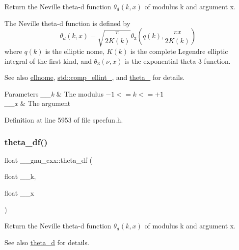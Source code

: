 Return the Neville theta-\/d function $ \theta_d(k,x) $ of modulus {\ttfamily k} and argument {\ttfamily x}.

The Neville theta-\/d function is defined by \[ \theta_d(k,x) = \sqrt{\frac{\pi}{2K(k)}} \theta_3\left(q(k),\frac{\pi x}{2K(k)}\right) \] where $ q(k) $ is the elliptic nome, $ K(k) $ is the complete Legendre elliptic integral of the first kind, and $ \theta_3(\nu,x) $ is the exponential theta-\/3 function. \begin{DoxySeeAlso}{See also}
\hyperlink{group__mathsf__gnu_ga7bfb34f8b5c0ed7c72040f9cb7034bba}{ellnome}, \hyperlink{group__mathsf__std_gad559217fb01e7a8b7a6e23eeedda64be}{std\+::comp\+\_\+ellint\+\_}, and \hyperlink{group__mathsf__gnu_ga146c3b8e86991e164d4bf143cda5f0fc}{theta\+\_} for details.
\end{DoxySeeAlso}

\begin{DoxyParams}{Parameters}
{\em \+\_\+\+\_\+k} & The modulus $ -1 <= k <= +1 $ \\
\hline
{\em \+\_\+\+\_\+x} & The argument \\
\hline
\end{DoxyParams}


Definition at line 5953 of file specfun.\+h.

\mbox{\label{group__mathsf__gnu_gad2dc6fcaf54d25cbfaad082623941118}} 
\subsubsection{\texorpdfstring{theta\+\_\+df()}{theta\_df()}}
{\footnotesize\ttfamily float \+\_\+\+\_\+gnu\+\_\+cxx\+::theta\+\_\+df (\begin{DoxyParamCaption}\item[{float}]{\+\_\+\+\_\+k,  }\item[{float}]{\+\_\+\+\_\+x }\end{DoxyParamCaption})\hspace{0.3cm}{\ttfamily [inline]}}

Return the Neville theta-\/d function $ \theta_d(k,x) $ of modulus {\ttfamily k} and argument {\ttfamily x}.

\begin{DoxySeeAlso}{See also}
\hyperlink{group__mathsf__gnu_ga258edb995137d9e6344b3cd750266d74}{theta\+\_\+d} for details. 
\end{DoxySeeAlso}


